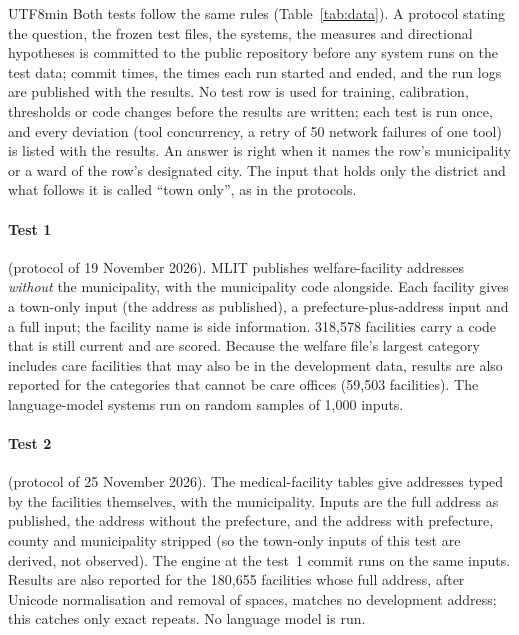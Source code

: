 \documentclass[10pt]{article}
\begin{document}
\begin{CJK}{UTF8}{min}
Both tests follow the same rules (Table~\ref{tab:data}). A protocol stating the question, the frozen test
files, the systems, the measures and directional hypotheses is committed to the public repository before
any system runs on the test data; commit times, the times each run started and ended, and the run logs
are published with the results. No test row is used for training, calibration, thresholds or code
changes before the results are written; each test is run once, and every deviation (tool concurrency, a
retry of 50 network failures of one tool) is listed with the results. An answer is right when it names
the row's municipality or a ward of the row's designated city. The input that holds only the district
and what follows it is called ``town only'', as in the protocols.

\paragraph{Test 1} (protocol of 19 November 2026). MLIT publishes welfare-facility addresses
\emph{without} the municipality, with the municipality code alongside. Each facility gives a town-only
input (the address as published), a prefecture-plus-address input and a full input; the facility name
is side information. 318,578 facilities carry a code that is still current and are scored. Because the
welfare file's largest category includes care facilities that may also be in the development data,
results are also reported for the categories that cannot be care offices (59,503 facilities). The
language-model systems run on random samples of 1,000 inputs.

\paragraph{Test 2} (protocol of 25 November 2026). The medical-facility tables give addresses typed by the
facilities themselves, with the municipality. Inputs are the full address as published, the address
without the prefecture, and the address with prefecture, county and municipality stripped (so the
town-only inputs of this test are derived, not observed). The engine at the test~1 commit runs on the same
inputs. Results are also reported for the 180,655 facilities whose full address, after Unicode
normalisation and removal of spaces, matches no development address; this catches only exact repeats.
No language model is run.


\end{CJK}
\end{document}
